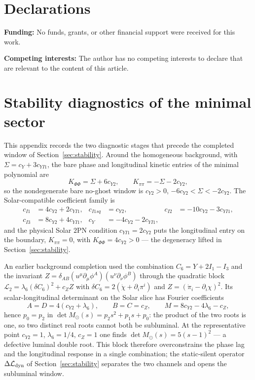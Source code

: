 \documentclass[12pt,a4paper]{article}
\begin{document}
\section*{Declarations}

\noindent\textbf{Funding:} No funds, grants, or other financial support
were received for this work.

\medskip
\noindent\textbf{Competing interests:} The author has no competing
interests to declare that are relevant to the content of this article.

\appendix

\section{Stability diagnostics of the minimal sector}
\label{app:stability}

This appendix records the two diagnostic stages that precede the completed
window of Section~\ref{sec:stability}. Around the homogeneous background,
with $\Sigma=c_Y+3c_{YI1}$, the bare phase and longitudinal kinetic entries
of the minimal polynomial are
\[
K_{\Phi\Phi}=\Sigma+6c_{Y2},\qquad
K_{\pi\pi}=-\Sigma-2c_{Y2},
\]
so the nondegenerate bare no-ghost window is $c_{Y2}>0$,
$-6c_{Y2}<\Sigma<-2c_{Y2}$. The Solar-compatible coefficient family is
\begin{align*}
c_{I1}&=4c_{Y2}+2c_{YI1}, &
c_{I1sq}&=c_{Y2}, &
c_{I2}&=-10c_{Y2}-3c_{YI1},\\
c_{I3}&=8c_{Y2}+4c_{YI1}, &
c_Y&=-4c_{Y2}-2c_{YI1}, & &
\end{align*}
and the physical Solar $2$PN condition $c_{YI1}=2c_{Y2}$ puts the
longitudinal entry on the boundary, $K_{\pi\pi}=0$, with
$K_{\Phi\Phi}=4c_{Y2}>0$ --- the degeneracy lifted in
Section~\ref{sec:stability}.

An earlier background completion used the combination $C_6=Y+2I_1-I_3$ and
the invariant $Z=\delta_{AB}(u^\mu\partial_\mu\phi^A)
(u^\nu\partial_\nu\phi^B)$ through the quadratic block
$\mathcal L_2=\lambda_6(\delta C_6)^2+c_ZZ$ with
$\delta C_6=2(\dot\chi+\partial_i\pi^i)$ and
$Z=(\dot\pi_i-\partial_i\chi)^2$. Its scalar-longitudinal determinant on the
Solar slice has Fourier coefficients
\[
A=D=4(c_{Y2}+\lambda_6),\qquad B=C=c_Z,\qquad
M=8c_{Y2}-4\lambda_6-c_Z,
\]
hence $p_0=p_2$ in $\det M_\odot(s)=p_2s^2+p_1s+p_0$: the product of the two
roots is one, so two distinct real roots cannot both be subluminal. At the
representative point $c_{Y2}=1$, $\lambda_6=1/4$, $c_Z=1$ one finds
$\det M_\odot(s)=5(s-1)^2$ --- a defective luminal double root. This block
therefore overconstrains the phase lag and the longitudinal response in a
single combination; the static-silent operator $\Delta\mathcal L_{\rm dyn}$
of Section~\ref{sec:stability} separates the two channels and opens the
subluminal window.
\end{document}
